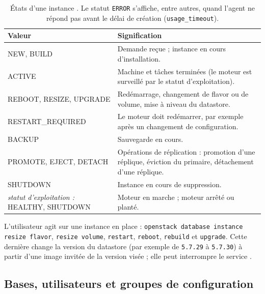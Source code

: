 \begin{table}[!ht]
\centering
\renewcommand{\arraystretch}{1.3}
\begin{tabular}{@{}>{\raggedright\arraybackslash\ttfamily\small}p{4.3cm}>{\raggedright\arraybackslash}p{11.2cm}@{}}
\toprule
\textrm{\textbf{Valeur}} & \textbf{Signification} \\
\midrule
NEW, BUILD & Demande reçue ; instance en cours d'installation. \\
ACTIVE & Machine et tâches terminées (le moteur est surveillé par le statut d'exploitation). \\
REBOOT, RESIZE, UPGRADE & Redémarrage, changement de flavor ou de volume, mise à niveau du datastore. \\
RESTART\_REQUIRED & Le moteur doit redémarrer, par exemple après un changement de configuration. \\
BACKUP & Sauvegarde en cours. \\
PROMOTE, EJECT, DETACH & Opérations de réplication : promotion d'une réplique, éviction du primaire, détachement d'une réplique. \\
SHUTDOWN & Instance en cours de suppression. \\
\textrm{\textit{statut d'exploitation :}} HEALTHY, SHUTDOWN & Moteur en marche ; moteur arrêté ou planté. \\
\bottomrule
\end{tabular}
\caption{États d'une instance \parencite{trove-status}. Le statut \texttt{ERROR} s'affiche, entre autres, quand l'agent ne répond pas avant le délai de création
(\texttt{usage\_\allowbreak timeout}).}
\label{tab:tr-statuts}
\end{table}

L'utilisateur agit sur une instance en place : \texttt{openstack database instance resize flavor}, \texttt{resize volume},
\texttt{restart}, \texttt{reboot}, \texttt{rebuild} et \texttt{upgrade}. Cette dernière change la version du datastore (par exemple de
\texttt{5.7.29} à \texttt{5.7.30}) à partir d'une image invitée de la version visée ; elle peut interrompre le service
\parencite{trove-upgrade-ds}.

\subsection{Bases, utilisateurs et groupes de configuration}\label{sec:tr-config}

